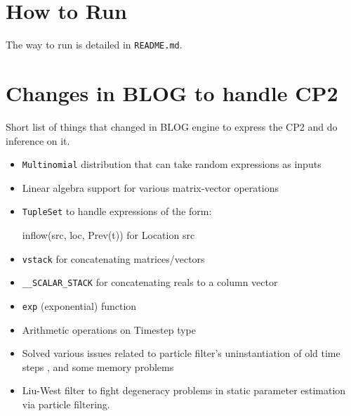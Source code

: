 \documentclass[11pt]{article}
\begin{document}
\section{How to Run}
The way to run is detailed in \verb|README.md|. 

\section{Changes in BLOG to handle CP2}
Short list of things that changed in BLOG engine to express the CP2 and do inference on it.
\begin{itemize}
\item \verb|Multinomial| distribution that can take random expressions as inputs
\item Linear algebra support for various matrix-vector operations
\item \verb|TupleSet| to handle expressions of the form:
\begin{blogcode}
  { inflow(src, loc, Prev(t)) for Location src }
\end{blogcode}
\item \verb|vstack| for concatenating matrices/vectors
\item \verb|__SCALAR_STACK| for concatenating reals to a column vector
\item \verb|exp| (exponential) function
\item Arithmetic operations on Timestep type
\item Solved various issues related to particle filter's uninstantiation of old time steps , and some memory problems
\item Liu-West filter \cite{liu2001combined} to fight degeneracy problems in static parameter estimation via particle filtering.
\end{itemize}






\end{document}

